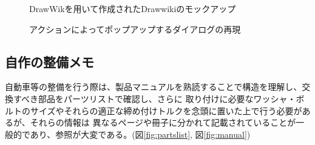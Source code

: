 \begin{figure}[H] \begin{minipage}{0.5\hsize}
                      \begin{center} 
                      \end{center} \caption{DrawWikを用いて作成されたDrawwikiのモックアップ} \label{fig:protodrawwiki1}
\end{minipage} \begin{minipage}{0.5\hsize}
                   \begin{center} 
                   \end{center} \caption{アクションによってポップアップするダイアログの再現} \label{fig:protodrawwiki2}
\end{minipage}
\end{figure}


\subsection{自作の整備メモ}
自動車等の整備を行う際は、製品マニュアルを熟読することで構造を理解し、交換すべき部品をパーツリストで確認し、さらに
取り付けに必要なワッシャ・ボルトのサイズやそれらの適正な締め付けトルクを念頭に置いた上で行う必要があるが、それらの情報は
異なるページや冊子に分かれて記載されていることが一般的であり、参照が大変である。(図\ref{fig:partslist}, 図\ref{fig:manual})

